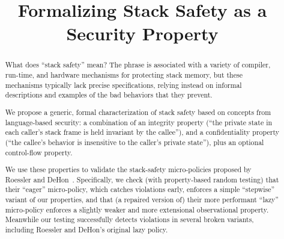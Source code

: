 \documentclass[10pt,conference]{ieeetran}%
\theoremstyle{definition}
\begin{document}
\title{Formalizing Stack Safety as a Security Property}




\ifcameraready
{}  %
\fi

\maketitle

\begin{abstract}

What does ``stack safety'' mean? The phrase is associated with a
variety of compiler,
run-time, and hardware mechanisms for protecting stack
memory, but these mechanisms typically lack precise specifications,
relying instead on informal descriptions and examples of the bad
behaviors that they prevent.

We propose a generic, formal characterization
of stack safety based on concepts from language-based security: a
combination of an integrity property (``the private
state in each caller's stack frame is held invariant by the callee''),
and a confidentiality property (``the callee's behavior is insensitive to the
caller's private state''), plus an optional control-flow property.

We use these properties to validate the stack-safety micro-policies
proposed by Roessler and DeHon~\cite{DBLP:conf/sp/RoesslerD18}.
Specifically, we check (with
property-based random testing) that their ``eager''
micro-policy, which catches violations early, enforces a
simple ``stepwise'' variant of our properties, and that
(a repaired version of) their more performant
``lazy'' micro-policy enforces a slightly weaker and more extensional
observational property. Meanwhile our testing successfully detects violations
in several broken variants, including Roessler and DeHon's original lazy policy.

\end{abstract}
\end{document}
